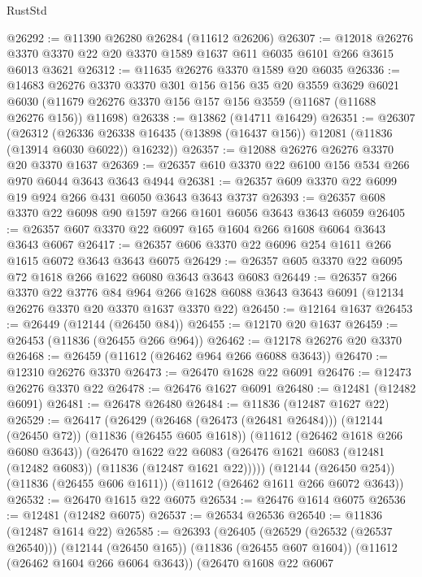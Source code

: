 \begin{lexlean}{RustStd}
\begin{coremodule}
@26292 := @11390 @26280 @26284 (@11612 @26206)
@26307 := @12018
    @26276
    @3370
    @3370
    @22
    @20
    @3370
    @1589
    @1637
    @611
    @6035
    @6101
    @266
    @3615
    @6013
    @3621
@26312 := @11635 @26276 @3370 @1589 @20 @6035
@26336 := @14683
    @26276
    @3370
    @3370
    @301
    @156
    @156
    @35
    @20
    @3559
    @3629
    @6021
    @6030
    (@11679 @26276 @3370 @156 @157 @156 @3559 (@11687 (@11688 @26276 @156)) @11698)
@26338 := @13862 (@14711 @16429)
@26351 := @26307
    (@26312
      (@26336 @26338 @16435 (@13898 (@16437 @156)) @12081 (@11836 (@13914 @6030 @6022)) @16232))
@26357 := @12088 @26276 @26276 @3370 @20 @3370 @1637
@26369 := @26357 @610 @3370 @22 @6100 @156 @534 @266 @970 @6044 @3643 @3643 @4944
@26381 := @26357 @609 @3370 @22 @6099 @19 @924 @266 @431 @6050 @3643 @3643 @3737
@26393 := @26357 @608 @3370 @22 @6098 @90 @1597 @266 @1601 @6056 @3643 @3643 @6059
@26405 := @26357 @607 @3370 @22 @6097 @165 @1604 @266 @1608 @6064 @3643 @3643 @6067
@26417 := @26357 @606 @3370 @22 @6096 @254 @1611 @266 @1615 @6072 @3643 @3643 @6075
@26429 := @26357 @605 @3370 @22 @6095 @72 @1618 @266 @1622 @6080 @3643 @3643 @6083
@26449 := @26357
    @266
    @3370
    @22
    @3776
    @84
    @964
    @266
    @1628
    @6088
    @3643
    @3643
    @6091
    (@12134 @26276 @3370 @20 @3370 @1637 @3370 @22)
@26450 := @12164 @1637
@26453 := @26449 (@12144 (@26450 @84))
@26455 := @12170 @20 @1637
@26459 := @26453 (@11836 (@26455 @266 @964))
@26462 := @12178 @26276 @20 @3370
@26468 := @26459 (@11612 (@26462 @964 @266 @6088 @3643))
@26470 := @12310 @26276 @3370
@26473 := @26470 @1628 @22 @6091
@26476 := @12473 @26276 @3370 @22
@26478 := @26476 @1627 @6091
@26480 := @12481 (@12482 @6091)
@26481 := @26478 @26480
@26484 := @11836 (@12487 @1627 @22)
@26529 := @26417
    (@26429
      (@26468 (@26473 (@26481 @26484)))
      (@12144 (@26450 @72))
      (@11836 (@26455 @605 @1618))
      (@11612 (@26462 @1618 @266 @6080 @3643))
      (@26470
        @1622
        @22
        @6083
        (@26476 @1621 @6083 (@12481 (@12482 @6083)) (@11836 (@12487 @1621 @22)))))
    (@12144 (@26450 @254))
    (@11836 (@26455 @606 @1611))
    (@11612 (@26462 @1611 @266 @6072 @3643))
@26532 := @26470 @1615 @22 @6075
@26534 := @26476 @1614 @6075
@26536 := @12481 (@12482 @6075)
@26537 := @26534 @26536
@26540 := @11836 (@12487 @1614 @22)
@26585 := @26393
    (@26405
      (@26529 (@26532 (@26537 @26540)))
      (@12144 (@26450 @165))
      (@11836 (@26455 @607 @1604))
      (@11612 (@26462 @1604 @266 @6064 @3643))
      (@26470
        @1608
        @22
        @6067

\end{coremodule}
\end{lexlean}

